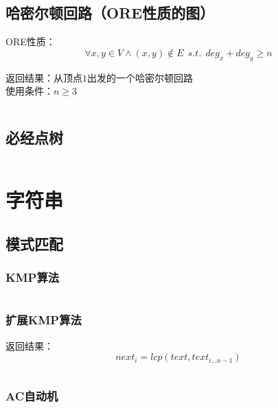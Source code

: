 \documentclass[landscape, oneside, a4paper, cs4size]{book}
\newcommand{\cppcode}[1]{
	\inputminted[mathescape,
	frame=lines,linenos]{cpp}{source/#1}
}
\begin{document}
\begin{multicols}{2}
\begin{spacing}{0.8}




\subsection{哈密尔顿回路（ORE性质的图）}


ORE性质：$$\forall x,y \in V \wedge (x,y) \notin E \ \ s.t. \ \ deg_x+deg_y \geq n$$

\indent 返回结果：从顶点$1$出发的一个哈密尔顿回路\\

\indent 使用条件：$n \geq 3$


\cppcode{graph-theory/hamiltonian-circuit-ore.cpp}


\subsection{必经点树}

\cppcode{graph-theory/dominator-tree.cpp}


\section{字符串}


\subsection{模式匹配}


\subsubsection{KMP算法}


\cppcode{string-manipulation/KMP.cpp}


\subsubsection{扩展KMP算法}


返回结果：$$next_i = lcp(text, text_{i \dots n-1})$$


\cppcode{string-manipulation/ExtKMP.cpp}


\subsubsection{AC自动机}



\end{spacing}
\end{multicols}
\end{document}
